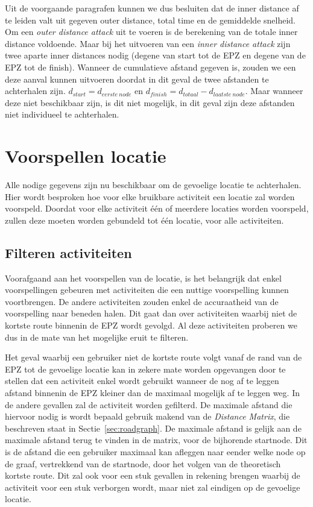 Uit de voorgaande paragrafen kunnen we dus besluiten dat de inner distance af
te leiden valt uit gegeven outer distance, total time en de gemiddelde
snelheid. Om een \textit{outer distance attack} uit te voeren is de berekening
van de totale inner distance voldoende. Maar bij het uitvoeren van een
\textit{inner distance attack} zijn twee aparte inner distances nodig (degene
van start tot de \ac{EPZ} en degene van de \ac{EPZ} tot de finish). Wanneer de
cumulatieve afstand gegeven is, zouden we een deze aanval kunnen uitvoeren
doordat in dit geval de twee afstanden te achterhalen zijn. $d_{start} =
    d_{eerste\ node}$ en $d_{finish} = d_{totaal} - d_{laatste\ node}$. Maar
wanneer deze niet beschikbaar zijn, is dit niet mogelijk, in dit geval zijn
deze afstanden niet individueel te achterhalen.

\section{Voorspellen locatie}
Alle nodige gegevens zijn nu beschikbaar om de gevoelige locatie te
achterhalen. Hier wordt besproken hoe voor elke bruikbare activiteit een
locatie zal worden voorspeld. Doordat voor elke activiteit één of meerdere
locaties worden voorspeld, zullen deze moeten worden gebundeld tot één locatie,
voor alle activiteiten.

\subsection{Filteren activiteiten}
Voorafgaand aan het voorspellen van de locatie, is het belangrijk dat enkel
voorspellingen gebeuren met activiteiten die een nuttige voorspelling kunnen
voortbrengen. De andere activiteiten zouden enkel de accuraatheid van de
voorspelling naar beneden halen. Dit gaat dan over activiteiten waarbij niet de
kortste route binnenin de \ac{EPZ} wordt gevolgd. Al deze activiteiten proberen
we dus in de mate van het mogelijke eruit te filteren.

Het geval waarbij een gebruiker niet de kortste route volgt vanaf de rand van
de \ac{EPZ} tot de gevoelige locatie kan in zekere mate worden opgevangen door
te stellen dat een activiteit enkel wordt gebruikt wanneer de nog af te leggen
afstand binnenin de \ac{EPZ} kleiner dan de maximaal mogelijk af te leggen weg.
In de andere gevallen zal de activiteit worden gefilterd. De maximale afstand
die hiervoor nodig is wordt bepaald gebruik makend van de \textit{Distance
    Matrix}, die beschreven staat in Sectie~\ref{sec:roadgraph}. De maximale
afstand is gelijk aan de maximale afstand terug te vinden in de matrix, voor de
bijhorende startnode. Dit is de afstand die een gebruiker maximaal kan afleggen
naar eender welke node op de graaf, vertrekkend van de startnode, door het
volgen van de theoretisch kortste route. Dit zal ook voor een stuk gevallen in
rekening brengen waarbij de activiteit voor een stuk verborgen wordt, maar niet
zal eindigen op de gevoelige locatie.

